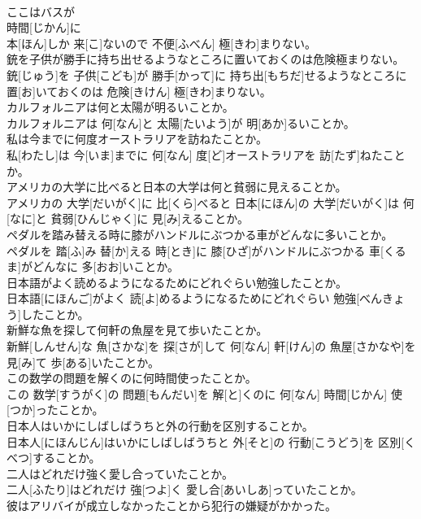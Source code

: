 \documentclass[8pt]{extreport}
\begin{document}
\begin{CJK}{UTF8}{min}
\\	ここはバスが 
\\	時間[じかん]に 
\\	本[ほん]しか 来[こ]ないので 不便[ふべん] 極[きわ]まりない。
\\	銃を子供が勝手に持ち出せるようなところに置いておくのは危険極まりない。	
\\	銃[じゅう]を 子供[こども]が 勝手[かって]に 持ち出[もちだ]せるようなところに 置[お]いておくのは 危険[きけん] 極[きわ]まりない。
\\	カルフォルニアは何と太陽が明るいことか。	
\\	カルフォルニアは 何[なん]と 太陽[たいよう]が 明[あか]るいことか。
\\	私は今までに何度オーストラリアを訪ねたことか。	
\\	私[わたし]は 今[いま]までに 何[なん] 度[ど]オーストラリアを 訪[たず]ねたことか。
\\	アメリカの大学に比べると日本の大学は何と貧弱に見えることか。	
\\	アメリカの 大学[だいがく]に 比[くら]べると 日本[にほん]の 大学[だいがく]は 何[なに]と 貧弱[ひんじゃく]に 見[み]えることか。
\\	ペダルを踏み替える時に膝がハンドルにぶつかる車がどんなに多いことか。	
\\	ペダルを 踏[ふ]み 替[か]える 時[とき]に 膝[ひざ]がハンドルにぶつかる 車[くるま]がどんなに 多[おお]いことか。
\\	日本語がよく読めるようになるためにどれぐらい勉強したことか。	
\\	日本語[にほんご]がよく 読[よ]めるようになるためにどれぐらい 勉強[べんきょう]したことか。
\\	新鮮な魚を探して何軒の魚屋を見て歩いたことか。	
\\	新鮮[しんせん]な 魚[さかな]を 探[さが]して 何[なん] 軒[けん]の 魚屋[さかなや]を 見[み]て 歩[ある]いたことか。
\\	この数学の問題を解くのに何時間使ったことか。	
\\	この 数学[すうがく]の 問題[もんだい]を 解[と]くのに 何[なん] 時間[じかん] 使[つか]ったことか。
\\	日本人はいかにしばしばうちと外の行動を区別することか。	
\\	日本人[にほんじん]はいかにしばしばうちと 外[そと]の 行動[こうどう]を 区別[くべつ]することか。
\\	二人はどれだけ強く愛し合っていたことか。	
\\	二人[ふたり]はどれだけ 強[つよ]く 愛し合[あいしあ]っていたことか。
\\	彼はアリバイが成立しなかったことから犯行の嫌疑がかかった。	

\end{CJK}
\end{document}
